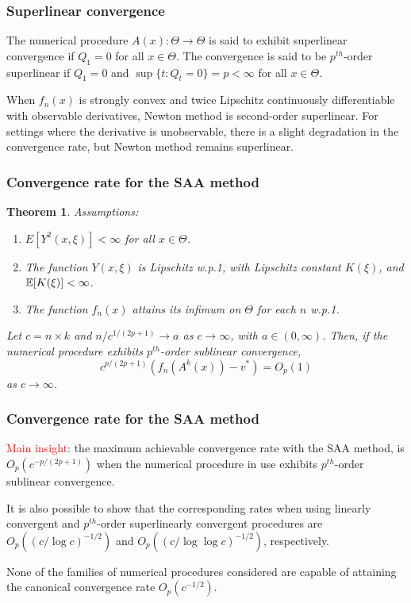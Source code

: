 \documentclass{beamer}
\newtheorem{theo}{Theorem}
\begin{document}
\begin{frame}
\frametitle{Superlinear convergence}

\begin{definition}
The numerical procedure $A(x) : \Theta \rightarrow \Theta$ is said to exhibit superlinear convergence if $Q_1 = 0$ for all $x \in \Theta$.
The convergence is said to be $p^{th}$-order superlinear if $Q_1 = 0$ and $\sup \{ t : Q_t = 0 \} = p < \infty$ for all $x \in \Theta$.
\end{definition}

\mbox{}

When $f_n(x)$ is strongly convex and twice Lipschitz continuously differentiable with observable derivatives, Newton method is second-order superlinear.
For settings where the derivative is unobservable, there is a slight degradation in the convergence rate, but Newton method remains superlinear.

\end{frame}

\begin{frame}
\frametitle{Convergence rate for the SAA method}

\begin{theo}
Assumptions:
\begin{enumerate}
\item
$E[ Y^2 ( x , \xi)] < \infty$ for all $x \in \Theta$.
\item
The function $Y(x, \xi)$ is Lipschitz w.p.1, with Lipschitz constant $K(\xi)$, and ${\mathbb{E}}[K(\xi)] < \infty$.
\item
The function $f_n(x)$ attains its infimum on $\Theta$ for each $n$ w.p.1.
\end{enumerate}
Let $c = n \times k$ and $n/c^{1 /( 2p + 1 )} \rightarrow a$ as $c \rightarrow \infty$, with $a \in (0, \infty)$.
Then, if the numerical procedure exhibits $p^{th}$-order sublinear convergence,
$$
c^{p /( 2p + 1 )} \left( f_n ( A^k ( x )) - v^* \right) = O_p(1)
$$
as $c \rightarrow \infty$.
\end{theo}

\end{frame}

\begin{frame}
\frametitle{Convergence rate for the SAA method}

\textcolor{red}{Main insight}: the maximum achievable convergence rate with the SAA method, is $O_p ( c^{- p /( 2p + 1 )})$ when the numerical
procedure in use exhibits $p^{th}$-order sublinear convergence.

\mbox{}

It is also possible to show that the corresponding rates when using linearly convergent and $p^{th}$-order superlinearly convergent procedures are $O_p (( c / \log c )^{-1/2} )$ and $O_p (( c / \log\log c )^{-1/2} )$, respectively.

\mbox{}

None of the families of numerical procedures considered are capable
of attaining the canonical convergence rate $O_p ( c^{-1/2} )$.

\end{frame}
\end{document}
